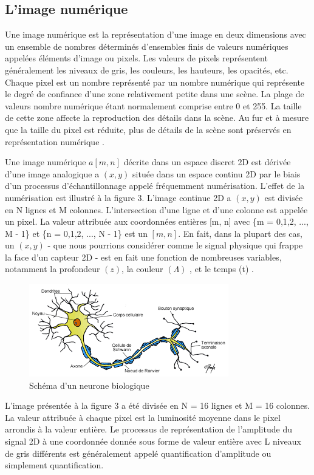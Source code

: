 \documentclass[12pt]{article}
\begin{document}
\subsection{L’image numérique}
Une image numérique est la représentation d'une image en deux dimensions avec un ensemble de nombres déterminés d'ensembles finis de valeurs numériques appelées éléments d'image ou pixels. Les valeurs de pixels représentent généralement les niveaux de gris, les couleurs, les hauteurs, les opacités, etc. Chaque pixel est un nombre représenté par un nombre numérique qui représente le degré de confiance d'une zone relativement petite dans une scène. La plage de valeurs nombre numérique étant normalement comprise entre 0 et 255. La taille de cette zone affecte la reproduction des détails dans la scène. Au fur et à mesure que la taille du pixel est réduite, plus de détails de la scène sont préservés en représentation numérique \cite{12}.

Une image numérique $a[m, n]$ décrite dans un espace discret 2D est dérivée d'une image analogique a $(x, y)$ située dans un espace continu 2D par le biais d'un processus d'échantillonnage appelé fréquemment numérisation. L'effet de la numérisation est illustré à la figure 3. L'image continue 2D a $(x, y)$ est divisée en N lignes et M colonnes. L'intersection d'une ligne et d'une colonne est appelée un pixel. La valeur attribuée aux coordonnées entières [m, n] avec \{m = 0,1,2, ..., M - 1\} et \{n = 0,1,2, ..., N - 1\} est un $[m, n]$. En fait, dans la plupart des cas, un $(x, y)$ - que nous pourrions considérer comme le signal physique qui frappe la face d’un capteur 2D - est en fait une fonction de nombreuses variables, notamment la profondeur $(z)$, la couleur $(\Lambda)$ ,  et le temps (t) \cite{13}.
\newpage
\begin{figure}[h]
\centering
\includegraphics[scale=1]{img-Chapiter-1/neurone.png}
\caption{Schéma d’un neurone biologique}
\end{figure}

L'image présentée à la figure 3 a été divisée en N = 16 lignes et M = 16 colonnes. La valeur attribuée à chaque pixel est la luminosité moyenne dans le pixel arrondis à la valeur entière. Le processus de représentation de l'amplitude du signal 2D à une coordonnée donnée sous forme de valeur entière avec L niveaux de gris différents est généralement appelé quantification d'amplitude ou simplement quantification.
\end{document}
